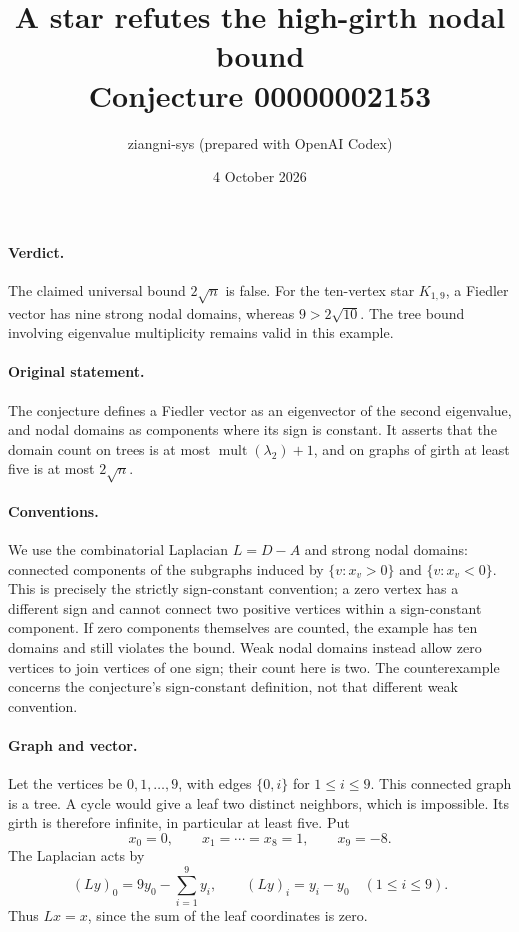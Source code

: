 \documentclass[11pt]{article}
\title{A star refutes the high-girth nodal bound\\Conjecture 00000002153}
\author{ziangni-sys (prepared with OpenAI Codex)}
\date{4 October 2026}
\begin{document}
\maketitle
\paragraph{Verdict.} The claimed universal bound $2\sqrt n$ is false.
For the ten-vertex star $K_{1,9}$, a Fiedler vector has nine strong nodal domains, whereas $9>2\sqrt{10}$. The tree bound involving eigenvalue multiplicity remains valid in this example.

\paragraph{Original statement.} The conjecture defines a Fiedler vector as an eigenvector of the second eigenvalue, and nodal domains as components where its sign is constant. It asserts that the domain count on trees is at most $\operatorname{mult}(\lambda_2)+1$, and on graphs of girth at least five is at most $2\sqrt n$.

\paragraph{Conventions.} We use the combinatorial Laplacian $L=D-A$ and strong nodal domains: connected components of the subgraphs induced by $\{v:x_v>0\}$ and $\{v:x_v<0\}$. This is precisely the strictly sign-constant convention; a zero vertex has a different sign and cannot connect two positive vertices within a sign-constant component. If zero components themselves are counted, the example has ten domains and still violates the bound. Weak nodal domains instead allow zero vertices to join vertices of one sign; their count here is two. The counterexample concerns the conjecture's sign-constant definition, not that different weak convention.

\paragraph{Graph and vector.} Let the vertices be $0,1,\ldots,9$, with edges $\{0,i\}$ for $1\leq i\leq9$. This connected graph is a tree. A cycle would give a leaf two distinct neighbors, which is impossible. Its girth is therefore infinite, in particular at least five. Put
\[
x_0=0,\qquad x_1=\cdots=x_8=1,\qquad x_9=-8.
\]
The Laplacian acts by
\[
(Ly)_0=9y_0-\sum_{i=1}^9y_i,\qquad (Ly)_i=y_i-y_0\quad(1\leq i\leq9).
\]
Thus $Lx=x$, since the sum of the leaf coordinates is zero.
\end{document}
